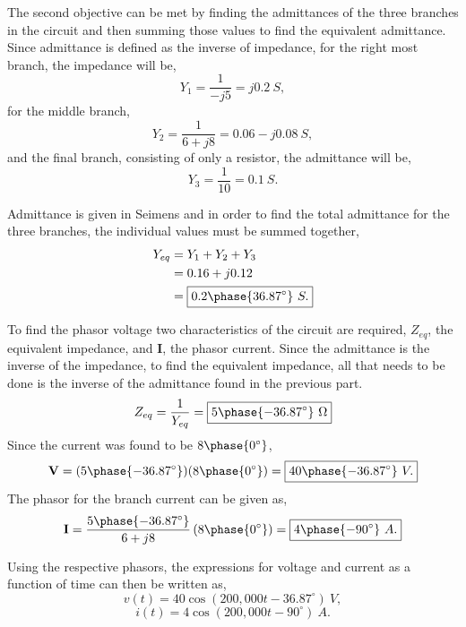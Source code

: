 \documentclass[12pt]{article}
\begin{document}
    \newpage
    \par The second objective can be met by finding the admittances of the three
    branches in the circuit and then summing those values to find the equivalent
    admittance. Since admittance is defined as the inverse of impedance, for the
    right most branch, the impedance will be,
    \[
        Y_1 = \frac{1}{-j 5} = j 0.2\ S,
    \]
    for the middle branch,
    \[
        Y_2 = \frac{1}{6 + j 8} = 0.06 - j 0.08\ S,
    \]
    and the final branch, consisting of only a resistor, the admittance will be,
    \[
        Y_3 = \frac{1}{10} = 0.1\ S.
    \]
    \par Admittance is given in Seimens and in order to find the total
    admittance for the three branches, the individual values must be summed
    together,
    \begin{align*}
        Y_{eq} &= Y_1 + Y_2 + Y_3 \\
               &= 0.16 + j 0.12 \\
               &= \boxed{0.2 \phase{36.87^{\circ}}\ S.}
    \end{align*}
    \par To find the phasor voltage two characteristics of the circuit are
    required, $Z_{eq}$, the equivalent impedance, and $\textbf{I}$, the phasor
    current. Since the admittance is the inverse of the impedance, to find the
    equivalent impedance, all that needs to be done is the inverse of the
    admittance found in the previous part.
    \[
        Z_{eq} = \frac{1}{Y_{eq}} = \boxed{5 \phase{-36.87^{\circ}}\ \Omega}
    \]
    Since the current was found to be $8 \phase{0^{\circ}}$,
    \[
        \textbf{V} = (5 \phase{-36.87^{\circ}})(8 \phase{0^{\circ}}) =
        \boxed{40 \phase{-36.87^{\circ}}\ V.}
    \]
    The phasor for the branch current can be given as,
    \[
        \textbf{I} = \frac{5 \phase{-36.87^{\circ}}}{6+j 8} \left( 8
        \phase{0^{\circ}} \right) = \boxed{4 \phase{-90^{\circ}}\ A.}
    \]
    \par Using the respective phasors, the expressions for voltage and current
    as a function of time can then be written as,
    \[
        v(t) = 40 \cos (200,000t - 36.87^{\circ})\ V,
    \]
    \[
        i(t) = 4 \cos (200,000t - 90^{\circ})\ A.
    \]
\end{document}
